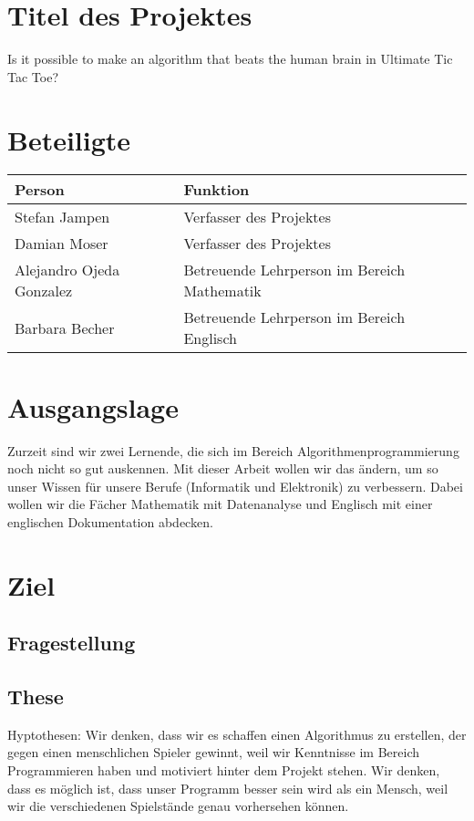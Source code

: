 \section{Titel des Projektes}
Is it possible to make an algorithm that beats the human brain in Ultimate Tic Tac Toe?

\section{Beteiligte}
\begin{tabularx}{\textwidth}{l|X}
\textbf{Person} & \textbf{Funktion} \\\hline
Stefan Jampen & Verfasser des Projektes \\
Damian Moser & Verfasser des Projektes \\
Alejandro Ojeda Gonzalez & Betreuende Lehrperson im Bereich Mathematik \\
Barbara Becher & Betreuende Lehrperson im Bereich Englisch \\
\end{tabularx}

\section{Ausgangslage}
Zurzeit sind wir zwei Lernende, die sich im Bereich Algorithmenprogrammierung noch nicht so gut auskennen. Mit dieser Arbeit wollen wir das ändern, um so unser Wissen für unsere Berufe (Informatik und Elektronik) zu verbessern. Dabei wollen wir die Fächer Mathematik mit Datenanalyse und Englisch mit einer englischen Dokumentation abdecken.

\section{Ziel}

\subsection{Fragestellung}

\subsection{These}
Hyptothesen:
Wir denken, dass wir es schaffen einen Algorithmus zu erstellen, der gegen einen menschlichen Spieler gewinnt, weil wir Kenntnisse im Bereich Programmieren haben und motiviert hinter dem Projekt stehen.
Wir denken, dass es möglich ist, dass unser Programm besser sein wird als ein Mensch, weil wir die verschiedenen Spielstände genau vorhersehen können.

